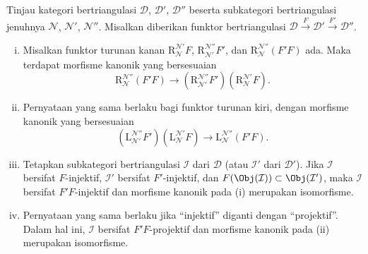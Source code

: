 \begin{teorema}\label{prop:localization-triangulated-composite}
	Tinjau kategori bertriangulasi $\mathcal{D}$, $\mathcal{D}'$,
	$\mathcal{D}''$ beserta subkategori bertriangulasi jenuhnya
	$\mathcal{N}$, $\mathcal{N}'$, $\mathcal{N}''$. Misalkan diberikan funktor
	bertriangulasi
	$\mathcal{D}\xrightarrow{F}\mathcal{D}'\xrightarrow{F'}\mathcal{D}''$.
	\begin{enumerate}[(i)]
		\item Misalkan funktor turunan kanan
		$\mathrm{R}^{\mathcal{N}'}_{\mathcal{N}}F$,
		$\mathrm{R}^{\mathcal{N}''}_{\mathcal{N}'}F'$, dan
		$\mathrm{R}^{\mathcal{N}''}_{\mathcal{N}}(F'F)$ ada. Maka terdapat
		morfisme kanonik yang bersesuaian
		\[ \mathrm{R}^{\mathcal{N}''}_{\mathcal{N}} (F' F) \to \left( \mathrm{R}^{\mathcal{N}''}_{\mathcal{N}'} F' \right) \left( \mathrm{R}^{\mathcal{N}'}_{\mathcal{N}} F \right). \]
		\item Pernyataan yang sama berlaku bagi funktor turunan kiri, dengan
		morfisme kanonik yang bersesuaian
		\[ \left( \mathrm{L}^{\mathcal{N}''}_{\mathcal{N'}} F' \right) \left( \mathrm{L}^{\mathcal{N}'}_{\mathcal{N}} F \right) \to \mathrm{L}^{\mathcal{N}''}_{\mathcal{N}} (F' F). \]
		\item Tetapkan subkategori bertriangulasi $\mathcal{I}$ dari
		$\mathcal{D}$ (atau $\mathcal{I}'$ dari $\mathcal{D}'$). Jika
		$\mathcal{I}$ bersifat $F$-injektif, $\mathcal{I}'$ bersifat
		$F'$-injektif, dan
		$F(\Obj(\mathcal{I}))\subset\Obj(\mathcal{I}')$, maka $\mathcal{I}$
		bersifat $F'F$-injektif dan morfisme kanonik pada (i) merupakan
		isomorfisme.
		\item Pernyataan yang sama berlaku jika ``injektif'' diganti dengan
		``projektif''. Dalam hal ini, $\mathcal{I}$ bersifat $F'F$-projektif dan
		morfisme kanonik pada (ii) merupakan isomorfisme.
	\end{enumerate}
\end{teorema}
